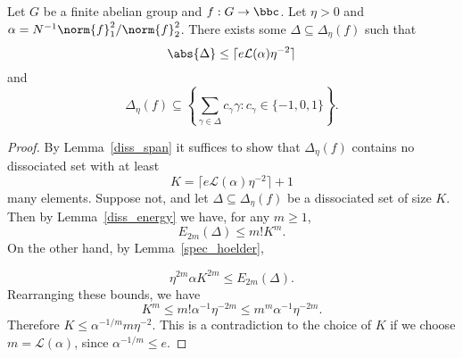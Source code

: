 \begin{theorem}
\label{chang}
\leanok
Let $G$ be a finite abelian group and $f:G\to \bbc$. Let $\eta >0$ and $\alpha=N^{-1}\norm{f}_1^2/\norm{f}_2^2$. There exists some $\Delta\subseteq \Delta_\eta(f)$ such that
\[\abs{\Delta}\le \lceil e\mathcal{L}(\alpha)\eta^{-2}\rceil \]
and
\[\Delta_\eta(f)\subseteq \left\{ \sum_{\gamma\in\Delta}c_\gamma \gamma : c_\gamma\in \{-1,0,1\} \right\}.\]
\end{theorem}

\begin{proof}
\leanok
By Lemma~\ref{diss_span} it suffices to show that $\Delta_\eta(f)$ contains no dissociated set with at least
\[K= \lceil e\mathcal{L}(\alpha)\eta^{-2}\rceil+1\]
many elements. Suppose not, and let $\Delta\subseteq \Delta_\eta(f)$ be a dissociated set of size $K$. Then by Lemma~\ref{diss_energy} we have, for any $m\geq 1$,
\[E_{2m}(\Delta)\le m!K^m.\]
On the other hand, by Lemma~\ref{spec_hoelder},

\[\eta^{2m}\alpha K^{2m}\le E_{2m}(\Delta).\]
Rearranging these bounds, we have
\[K^m \le m! \alpha^{-1}\eta^{-2m}\le m^m\alpha^{-1}\eta^{-2m}.\]
Therefore $K\le \alpha^{-1/m}m\eta^{-2}$. This is a contradiction to the choice of $K$ if we choose $m=\mathcal{L}(\alpha)$, since $\alpha^{-1/m}\le e$.
\end{proof}
